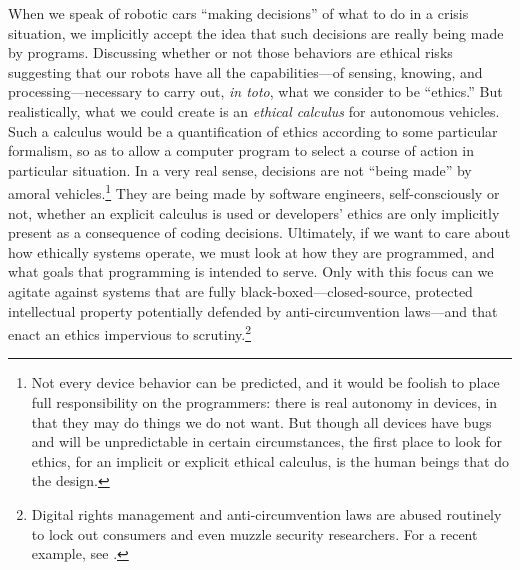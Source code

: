 
When we
speak of robotic cars ``making decisions'' of what to do in a crisis
situation, we implicitly accept the idea that such decisions are
really being made by programs. Discussing whether or not those
behaviors are ethical risks suggesting that our robots have all the
capabilities---of sensing, knowing, and processing---necessary to
carry out, \emph{in toto}, what we consider to be ``ethics.'' But
realistically, what we could create is an \emph{ethical calculus} for 
autonomous vehicles. Such a calculus would be a quantification of
ethics according to some particular formalism, so as to allow a
computer program to select a course of action in particular
situation. In a very real sense, decisions are not
``being made'' by amoral vehicles.\footnote{Not every device behavior
can be predicted, and it would be foolish to place full responsibility
on the programmers: there is real autonomy in devices, in that they
may do things we do not want. But though all devices have bugs and
will be unpredictable in certain circumstances, the first place to
look for ethics, for an implicit or explicit ethical calculus, is the
human beings 
that do the design.} They are being made by software engineers,
self-consciously or not, whether an
explicit calculus is used or developers' ethics are only
implicitly present as a consequence of coding decisions. Ultimately,
if we want to care about how ethically systems
operate, we must look at how they are programmed, and what goals that
programming is intended to serve. Only with this focus can we agitate
against systems that are fully black-boxed---closed-source, protected
intellectual property potentially defended by anti-circumvention
laws---and that enact an ethics impervious to scrutiny.\footnote{Digital
  rights management and anti-circumvention laws are abused routinely
  to lock out consumers and even muzzle security researchers. For a
  recent example, see \cite{higgins}.
}



